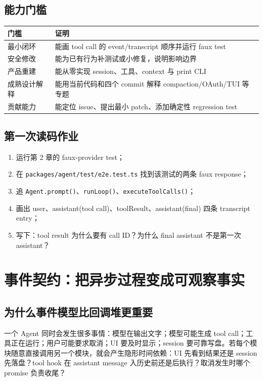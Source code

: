 \documentclass[UTF8,openany,11pt]{ctexbook}
\newcommand{\pathref}[1]{\texttt{#1}}
\begin{document}
\section{能力门槛}
\begin{longtable}{p{}p{}}
\toprule
门槛 & 证明\\
\midrule
最小闭环 & 能画 tool call 的 event/transcript 顺序并运行 faux test\\
安全修改 & 能为已有行为补测试或小修复，说明影响边界\\
产品重建 & 能从零实现 session、工具、context 与 print CLI\\
成熟设计解释 & 能用当前代码和四个 commit 解释 compaction/OAuth/TUI 等专题\\
贡献能力 & 能定位 issue、提出最小 patch、添加确定性 regression test\\
\bottomrule
\end{longtable}

\section{第一次读码作业}
\begin{enumerate}
\item 运行第 2 章的 faux-provider test；
\item 在 \pathref{packages/agent/test/e2e.test.ts} 找到该测试的两条 faux response；
\item 追 \texttt{Agent.prompt()}、\texttt{runLoop()}、\texttt{executeToolCalls()}；
\item 画出 user、assistant(tool call)、toolResult、assistant(final) 四条 transcript entry；
\item 写下：tool result 为什么要有 call ID？为什么 final assistant 不是第一次 assistant？
\end{enumerate}

\chapter{事件契约：把异步过程变成可观察事实}

\section{为什么事件模型比回调堆更重要}
一个 Agent 同时会发生很多事情：模型在输出文字；模型可能生成 tool call；工具正在运行；用户可能要求取消；UI 要及时显示；session 要可靠写盘。若每个模块随意直接调用另一个模块，就会产生隐形时间依赖：UI 先看到结果还是 session 先落盘？tool hook 在 assistant message 入历史前还是后执行？取消发生时哪个 promise 负责收尾？
\end{document}
